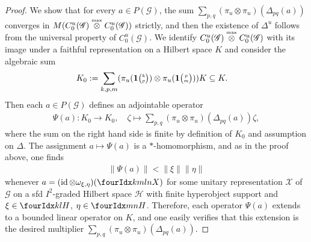 \begin{proof}
  We  show that for every $a \in P(\mathscr{G})$, the sum
  $\sum_{p,q} (\pi_{u} \otimes \pi_{u})(\Delta_{pq}(a))$ converges in
  $M(C^{u}_{0}(\mathscr{G})  \stackrel{\text{\tiny max}}{\otimes} C^{u}_{0}(\mathscr{G}))$
  strictly, and then the existence of $\Delta^{u}$ follows from the
  universal property of $C^{u}_{0}(\mathscr{G})$. We identify
  $C^{u}_{0}(\mathscr{G})  \stackrel{\text{\tiny max}}{\otimes} C^{u}_{0}(\mathscr{G})$ with its
  image under a faithful representation on a Hilbert
  space $K$ and consider the algebraic sum
  \begin{align*}
    K_{0}&:= \sum_{k,p,m} (\pi_{u}(\mathbf{1}{\tiny {\begin{pmatrix} k\\p\end{pmatrix}}}) \otimes \pi_{u}(\mathbf{1}{\tiny {\begin{pmatrix} p\\m\end{pmatrix}}}))K
    \subseteq K.
  \end{align*}
  Then each $a\in P(\mathscr{G})$ defines an adjointable operator
\begin{align*}
  \Psi(a) \colon K_{0} \to K_{0}, \quad \zeta \mapsto
  \sum_{p,q} (\pi_{u} \otimes \pi_{u})(\Delta_{pq}(a))\zeta,
\end{align*}
where the sum on the right hand side is finite by definition of
$K_{0}$ and assumption on $\Delta$. The assignment $a\mapsto
\Psi(a)$ is a $*$-homomorphism, and as in the proof above, one
finds
\begin{align*}
  \| \Psi(a)\|<\|\xi\|\|\eta\|
\end{align*}
whenever $a=(\id \otimes \omega_{\xi,\eta})(\Gr{X}{k}{l}{m}{n})$ for
some unitary representation $\mathscr{X}$ of $\mathscr{G}$ on a sfd
$I^{2}$-graded Hilbert space $\mathcal{H}$ with finite hyperobject
support and $\xi\in \Gru{H}{k}{l}$, $\eta\in
\Gru{H}{m}{n}$. Therefore, each operator $\Psi(a)$ extends
to a bounded linear operator on $K$, and one easily verifies that
this extension is the desired multiplier
  $\sum_{p,q} (\pi_{u} \otimes \pi_{u})(\Delta_{pq}(a))$. 

\end{proof}

